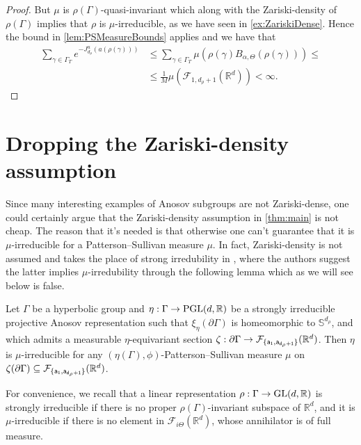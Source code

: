 \documentclass{report}
\begin{document}
\begin{proof}
    But $\mu$ is $\rho(\Gamma)$-quasi-invariant which along with the Zariski-density of $\rho(\Gamma)$ implies that $\rho$ is $\mu$-irreducible, as we have seen in \cref{ex:ZariskiDense}.
    Hence the bound in \cref{lem:PSMeasureBounds} applies and we have that
    \begin{align*}
        \sum_{\gamma \in \Gamma_T} e^{-J_{d_\rho}^u(a(\rho(\gamma)))} &\leq
        \sum_{\gamma \in \Gamma_T} \mu\left(\rho(\gamma) B_{\alpha, \Theta}(\rho(\gamma))\right) \leq\\
        &\leq
        \frac{1}{M} \mu\left(\mathcal F_{1, d_\rho + 1}(\mathbb R^d)\right) < \infty.
    \end{align*}

    
\end{proof}

\chapter{Dropping the Zariski-density assumption}\label{ch:no_zariski_density}
Since many interesting examples of Anosov subgroups are not Zariski-dense, one could certainly argue that the Zariski-density assumption in \cref{thm:main} is not cheap.
The reason that it's needed is that otherwise one can't guarantee that it is $\mu$-irreducible for a Patterson--Sullivan measure $\mu$. 
In fact, Zariski-density is not assumed and takes the place of strong irredubility in \cite{pozzetti_anosov_2023}, where the authors suggest the latter implies $\mu$-irredubility through the following lemma which as we will see below is false.

\begin{lemma}\label{lem:irreducibility}
Let $\Gamma$ be a hyperbolic group and $\eta:\Gamma \to \operatorname{{\mathrm{PGL}}}(d, \mathbb R)$ be a strongly irreducible projective Anosov representation such that $\xi_\eta(\partial \Gamma)$ is homeomorphic to $\mathbb S^{d_\rho}$, and which admits a measurable $\eta$-equivariant section
$\zeta: \partial \Gamma \to \mathcal F_{\{ \sf a_1, \sf a_{d_\rho + 1}\}} (\mathbb R^d)$.
Then $\eta$ is $\mu$-irreducible for any $(\eta(\Gamma), \phi)$-Patterson--Sullivan measure $\mu$ on $\zeta(\partial \Gamma) \subseteq \mathcal F_{\{ \sf a_1, \sf a_{d_\rho + 1}\}} (\mathbb R^d)$.
\end{lemma}

For convenience, we recall that a linear representation $\rho: \Gamma \to \operatorname{{\mathrm{GL}}}(d, \mathbb R)$ is strongly irreducible if there is no proper $\rho(\Gamma)$-invariant subspace of $\mathbb R^d$,
and it is $\mu$-irreducible if there is no element in $\mathcal F_{i \Theta}(\mathbb R^d)$, whose annihilator is of full measure.
\end{document}
